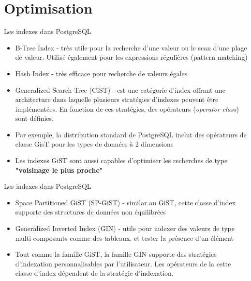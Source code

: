 
\section{Optimisation}


\begin{frame}[fragile]{Les indexes dans PostgreSQL}

   \begin{itemize}
      \item B-Tree Index - très utile pour la recherche d'une valeur ou le scan d'une plage de valeur. Utilisé également pour les expressions régulières (pattern matching)
      \item Hash Index - très efficace pour recherche de valeurs égales
      \item Generalized Search Tree (GiST) - est une catégorie d'index offrant une architecture dans laquelle plusieurs stratégies d'indexes peuvent être implémentées. En fonction de ces stratégies, des opérateurs (\textit{operator class}) sont définies.
      \item Par exemple, la distribution standard de PostgreSQL inclut des opérateurs de classe GisT pour les types de données à 2 dimensions
      \item Les indexes GiST sont aussi capables d'optimiser les recherches de type \textbf{"voisinage le plus proche"}
   \end{itemize}

\begin{toile}
\end{toile}

\end{frame}


\begin{frame}[fragile]{Les indexes dans PostgreSQL}


   \begin{itemize}
      \item Space Partitioned GiST (SP-GiST) - similar au GiST, cette classe d'index supporte des structures de données non équilibrées
      \item Generalized Inverted Index (GIN) - utile pour indexer des valeurs de type multi-composants comme des tableaux. et tester la présence d'un élément
      \item Tout comme la famille GiST, la famille GIN supporte des stratégies d'indexation personnalisables par l'utilisateur. Les opérateurs de la cette classe d'index dépendent de la stratégie d'indexation.
   \end{itemize}

\end{frame}

